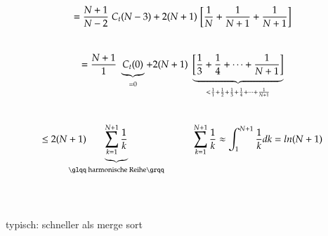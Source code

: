 \documentclass[11pt, fleqn]{scrreprt}
\begin{document}
\begin{itemize}
        \vspace*{-9mm}
        \[ = \frac{N+1}{N-2} \hspace*{1mm} C_t(N-3) + 2(N+1)  \hspace*{1mm}\biggl\lbrack\frac{1}{N}+\frac{1}{N+1}+ \frac{1}{N+1}\biggr\rbrack\] \\
        \vspace*{-9mm}
        \[= \frac{N+1}{1} \hspace*{1mm} \underbrace{C_t(0)}_{=0} + 2(N+1)  \hspace*{1mm} \underbrace{\biggl\lbrack \frac{1}{3} + \frac{1}{4} + \dots + \frac{1}{N+1}\biggr\rbrack}_{< \frac{1}{1}+ \frac{1}{2}+ \frac{1}{3}+\frac{1}{4}+\dots+\frac{1}{N+1}} \]\\
        \vspace*{-7mm}
        \[\leq 2(N+1)\hspace*{-7mm}\underbrace{ \sum_{k=1}^{N+1} \frac{1}{k}}_{\text{\glqq harmonische Reihe\grqq}}\hspace*{1cm}\sum_{k=1}^{N+1} \frac{1}{k} \approx \int_{1}^{N+1} \frac{1}{k} dk = ln(N+1) \]\\
        \vspace*{-9mm}
         \\
        \vspace*{5mm}

    typisch: schneller als merge sort


\end{itemize}
\end{document}
